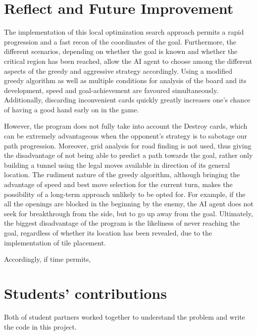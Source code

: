 \documentclass[12pt,twoside,letterpaper]{article}
\begin{document}
\section{Reflect and Future Improvement}
The implementation of this local optimization search approach permits a rapid progression and a fast recon of the coordinates of the goal. Furthermore, the different scenarios, depending on whether the goal is known and whether the critical region has been reached, allow the AI agent to choose among the different aspects of the greedy and aggressive strategy accordingly. Using a modified greedy algorithm as well as multiple conditions for analysis of the board and its development, speed and goal-achievement are favoured simultaneously. Additionally, discarding inconvenient cards quickly greatly increases one's chance of having a good hand early on in the game.
\par However, the program does not fully take into account the Destroy cards, which can be extremely advantageous when the opponent's strategy is to sabotage our path progression. Moreover, grid analysis for road finding is not used, thus giving the disadvantage of not being able to predict a path towards the goal, rather only building a tunnel using the legal moves available in direction of its general location. The rudiment nature of the greedy algorithm, although bringing the advantage of speed and best move selection for the current turn, makes the possibility of a long-term approach unlikely to be opted for. For example, if the all the openings are blocked in the beginning by the enemy, the AI agent does not seek for breakthrough from the side, but to go up away from the goal. Ultimately, the biggest disadvantage of the program is the likeliness of never reaching the goal, regardless of whether its location has been revealed, due to the implementation of tile placement.
\par Accordingly, if time permits,

\vfill
\section*{Students' contributions}
Both of student partners worked together to understand the problem and write the code in this project.
\end{document}
